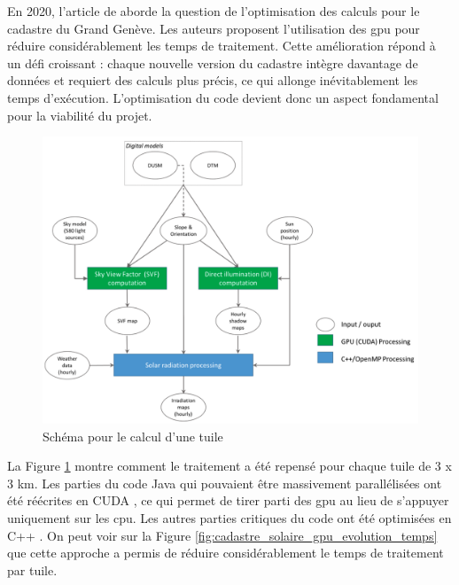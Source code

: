 {{\par{En 2020, l'article \cite{stendardo_gpu-enabled_2020} de \citeauthor{stendardo_gpu-enabled_2020} aborde la question de l'optimisation des calculs pour le cadastre du Grand Genève. Les auteurs proposent l'utilisation des \acrshort{gpu} pour réduire considérablement les temps de traitement. Cette amélioration répond à un défi croissant : chaque nouvelle version du cadastre intègre davantage de données et requiert des calculs plus précis, ce qui allonge inévitablement les temps d'exécution. L'optimisation du code devient donc un aspect fondamental pour la viabilité du projet.
\begin{figure}[H]
    \centering
    \includegraphics[width=1\linewidth]{02-main//figures/cadastre_solaire_gpu.png}
    \caption{Schéma pour le calcul d'une tuile}
    \label{fig:cadastre_solaire_gpu}
\end{figure}
La Figure \ref{fig:cadastre_solaire_gpu} montre comment le traitement a été repensé pour chaque tuile de 3 x 3 km. Les parties du code Java qui pouvaient être massivement parallélisées ont été réécrites en CUDA \cite{nvidia_cuda_nodate}, ce qui permet de tirer parti des \acrshort{gpu} au lieu de s'appuyer uniquement sur les \acrshort{cpu}. Les autres parties critiques du code ont été optimisées en C++ \cite{noauthor_c_2025}. On peut voir sur la Figure \ref{fig:cadastre_solaire_gpu_evolution_temps} que cette approche a permis de réduire considérablement le temps de traitement par tuile.

\begin{figure}[H]
    \centering
\end{figure}}}}
